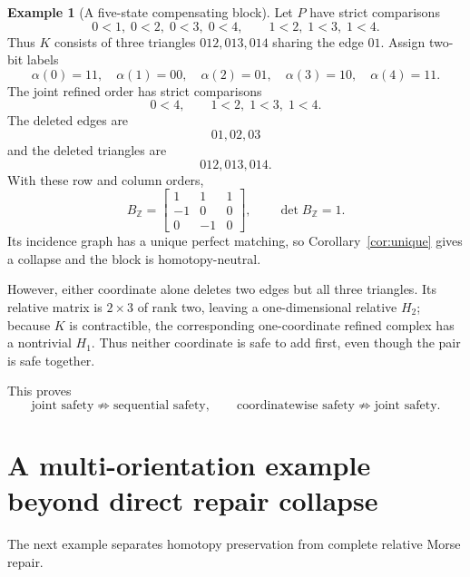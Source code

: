 \documentclass[11pt]{article}
\theoremstyle{definition}
\newtheorem{example}[theorem]{Example}
\begin{document}
\begin{example}[A five-state compensating block]\label{ex:compensating}
Let $P$ have strict comparisons
\[
0<1,\;0<2,\;0<3,\;0<4,\qquad
1<2,\;1<3,\;1<4.
\]
Thus $K$ consists of three triangles $012,013,014$ sharing the edge $01$.
Assign two-bit labels
\[
\alpha(0)=11,\quad
\alpha(1)=00,\quad
\alpha(2)=01,\quad
\alpha(3)=10,\quad
\alpha(4)=11.
\]
The joint refined order has strict comparisons
\[
0<4,
\qquad
1<2,\;1<3,\;1<4.
\]
The deleted edges are
\[
01,02,03
\]
and the deleted triangles are
\[
012,013,014.
\]
With these row and column orders,
\[
B_{\mathbb Z}=
\begin{bmatrix}
1&1&1\\
-1&0&0\\
0&-1&0
\end{bmatrix},
\qquad
\det B_{\mathbb Z}=1.
\]
Its incidence graph has a unique perfect matching, so Corollary~\ref{cor:unique} gives a collapse and the block is homotopy-neutral.

However, either coordinate alone deletes two edges but all three triangles. Its relative matrix is $2\times3$ of rank two, leaving a one-dimensional relative $H_2$; because $K$ is contractible, the corresponding one-coordinate refined complex has a nontrivial $H_1$. Thus neither coordinate is safe to add first, even though the pair is safe together.
\end{example}

This proves
\[
\boxed{
\text{joint safety}\not\Rightarrow\text{sequential safety},
\qquad
\text{coordinatewise safety}\not\Rightarrow\text{joint safety}.
}
\]

\section{A multi-orientation example beyond direct repair collapse}\label{sec:multiorientation}

The next example separates homotopy preservation from complete relative Morse repair.
\end{document}
